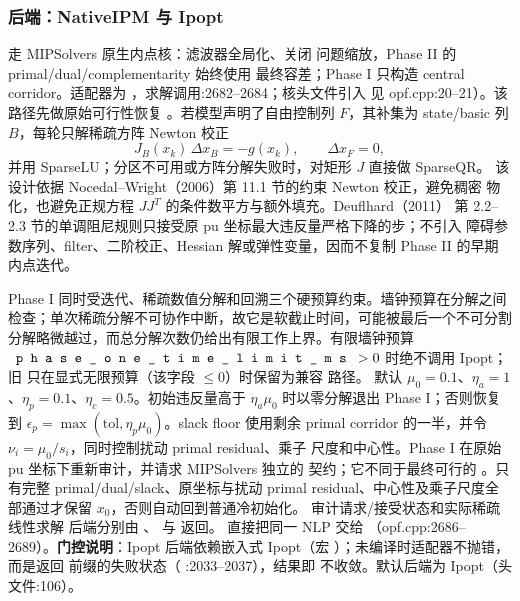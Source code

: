 \subsubsection*{后端：NativeIPM 与 Ipopt}
 走 MIPSolvers 原生内点核：滤波器全局化、关闭
问题缩放，Phase II 的 primal/dual/complementarity 始终使用
 最终容差；Phase I 只构造 central corridor。适配器为
，求解调用:2682--2684；核头文件引入
见 opf.cpp:20--21）。该路径先做原始可行性恢复
。若模型声明了自由控制列 $F$，其补集为
state/basic 列 $B$，每轮只解稀疏方阵 Newton 校正
\begin{equation}
 J_B(x_k)\,\Delta x_B=-g(x_k),\qquad \Delta x_F=0,
 \label{eq:phase-one-basic-newton}
\end{equation}
并用 SparseLU；分区不可用或方阵分解失败时，对矩形 $J$ 直接做 SparseQR。
该设计依据 Nocedal--Wright（2006）第 11.1 节的约束 Newton 校正，避免稠密
物化，也避免正规方程 $JJ^T$ 的条件数平方与额外填充。Deuflhard（2011）
第 2.2--2.3 节的单调阻尼规则只接受原 pu 坐标最大违反量严格下降的步；不引入
障碍参数序列、filter、二阶校正、Hessian 解或弹性变量，因而不复制 Phase II
的早期内点迭代。

Phase I 同时受迭代、稀疏数值分解和回溯三个硬预算约束。墙钟预算在分解之间
检查；单次稀疏分解不可协作中断，故它是软截止时间，可能被最后一个不可分割
分解略微越过，而总分解次数仍给出有限工作上界。有限墙钟预算
$\fld{phase\_one\_time\_limit\_ms}>0$ 时绝不调用 Ipopt；旧
 只在显式无限预算（该字段 $\le0$）时保留为兼容
路径。
默认 $\mu_0=0.1$、$\eta_a=1$、$\eta_p=0.1$、$\eta_c=0.5$。初始违反量高于
$\eta_a\mu_0$ 时以零分解退出 Phase I；否则恢复到
$\epsilon_p=\max(\mathrm{tol},\eta_p\mu_0)$。slack floor 使用剩余 primal
corridor 的一半，并令 $\nu_i=\mu_0/s_i$，同时控制扰动 primal residual、乘子
尺度和中心性。Phase I 在原始 pu 坐标下重新审计，并请求 MIPSolvers 独立的
 契约；它不同于最终可行的
。只有完整 primal/dual/slack、原坐标与扰动 primal
residual、中心性及乘子尺度全部通过才保留 $x_0$，否则自动回到普通冷初始化。
审计请求/接受状态和实际稀疏线性求解
后端分别由 、
 与
 返回。
 直接把同一 NLP 交给
（opf.cpp:2686--2689）。\textbf{门控说明}：Ipopt
后端依赖嵌入式 Ipopt（宏 ）；未编译时适配器不抛错，
而是返回  前缀的失败状态（
:2033--2037），结果即
不收敛。默认后端为 Ipopt（头文件:106）。

